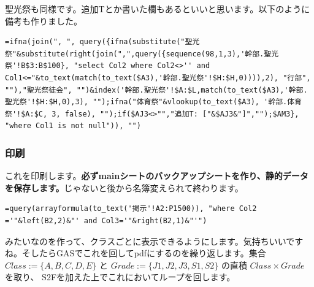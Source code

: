\documentclass[dvipdfmx,jb5]{jreport}
\begin{document}
聖光祭も同様です。追加Tとか書いた欄もあるといいと思います。以下のように備考も作りました。

\begin{lstlisting}
=ifna(join(", ", query({ifna(substitute("聖光祭"&substitute(right(join(",",query({sequence(98,1,3),'幹部.聖光祭'!B$3:B$100}, "select Col2 where Col2<>'' and Col1<="&to_text(match(to_text($A3),'幹部.聖光祭'!$H:$H,0)))),2), "行部", ""),"聖光祭徒会", "")&index('幹部.聖光祭'!$A:$L,match(to_text($A3),'幹部.聖光祭'!$H:$H,0),3), "");ifna("体育祭"&vlookup(to_text($A3), '幹部.体育祭'!$A:$C, 3, false), "");if($AJ3<>"","追加T: ["&$AJ3&"]","");$AM3}, "where Col1 is not null")), "")
\end{lstlisting}

\subsubsection{印刷}
これを印刷します。\textbf{必ずmainシートのバックアップシートを作り、静的データを保存します。}じゃないと後から名簿変えられて終わります。

\begin{lstlisting}
=query(arrayformula(to_text('掲示'!A2:P1500)), "where Col2 ='"&left(B2,2)&"' and Col3='"&right(B2,1)&"'")
\end{lstlisting}

みたいなのを作って、クラスごとに表示できるようにします。気持ちいいですね。そしたらGASでこれを回してpdfにするのを繰り返します。集合 $Class:=\{A,B,C,D,E\}$ と $Grade:=\{J1,J2,J3,S1,S2\}$ の直積 $Class\times Grade$ を取り、 S2Fを加えた上でこれにおいてループを回します。
\end{document}
